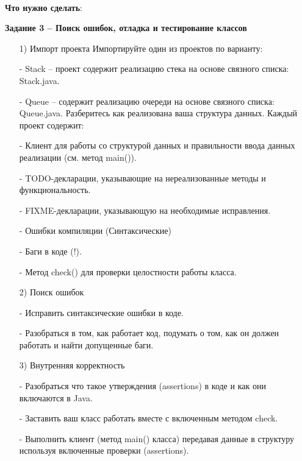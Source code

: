 \documentclass[12pt, a4paper, simple]{eskdtext}
\begin{document}
    \newpage

    \paragraph{} \textbf{Что нужно сделать}:

    \textbf{Задание 3 – Поиск ошибок, отладка и тестирование классов}

    \begin{enumerate}
        \item[1)] Импорт проекта Импортируйте один из проектов по варианту:
        \item[-] Stack – проект содержит реализацию стека на основе связного списка: Stack.java.
        \item[-] Queue – содержит реализацию очереди на основе связного списка: Queue.java.
        Разберитесь как реализована ваша структура данных. Каждый проект содержит:
        \item[-] Клиент для работы со структурой данных и правильности ввода данных реализации (см. метод main()).
        \item[-] TODO-декларации, указывающие на нереализованные методы и функциональность.
        \item[-] FIXME-декларации, указывающую на необходимые исправления.
        \item[-] Ошибки компиляции (Синтаксические)
        \item[-] Баги в коде (!).
        \item[-] Метод check() для проверки целостности работы класса.
        
        \item[2)] Поиск ошибок
        \item[-] Исправить синтаксические ошибки в коде.
        \item[-] Разобраться в том, как работает код, подумать о том, как он должен работать и найти допущенные баги.
        
        \item[3)] Внутренняя корректность
        \item[-] Разобраться что такое утверждения (assertions) в коде и как они включаются в Java.
        \item[-] Заставить ваш класс работать вместе с включенным методом check.
        \item[-] Выполнить клиент (метод main() класса) передавая данные в структуру используя включенные проверки (assertions).
        

\end{enumerate}
\end{document}

